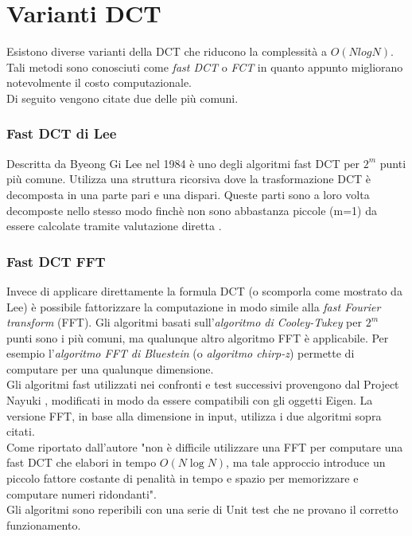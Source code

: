 \documentclass[a4paper,12pt]{report}
\begin{document}
\section{Varianti DCT}
Esistono diverse varianti della DCT che riducono la complessità a \(O(NlogN)\). Tali metodi sono conosciuti come \textit{fast DCT} o \textit{FCT} in quanto appunto migliorano notevolmente il costo computazionale.\\Di seguito vengono citate due delle più comuni.

\subsubsection*{Fast DCT di Lee}
Descritta da Byeong Gi Lee \cite{Lee} nel 1984 è uno degli algoritmi fast DCT per \(2^m\) punti più comune. Utilizza una struttura ricorsiva dove la trasformazione DCT è decomposta in una parte pari e una dispari. Queste parti sono a loro volta decomposte nello stesso modo finchè non sono abbastanza piccole (m=1) da essere calcolate tramite valutazione diretta \cite{LAGERSTRM2001DesignAI}.

\subsubsection*{Fast DCT FFT}
Invece di applicare direttamente la formula DCT (o scomporla come mostrato da Lee) è possibile fattorizzare la computazione in modo simile alla \textit{fast Fourier transform} (FFT). Gli algoritmi basati sull'\textit{algoritmo di Cooley-Tukey} \cite{10.2307/2003354} per \(2^m\) punti sono i più comuni, ma qualunque altro algoritmo FFT è applicabile. Per esempio l'\textit{algoritmo FFT di Bluestein} (o \textit{algoritmo chirp-z}) permette di computare per una qualunque dimensione.\\

\noindent Gli algoritmi fast utilizzati nei confronti e test successivi provengono dal Project Nayuki \cite{nayuki}, modificati in modo da essere compatibili con gli oggetti Eigen. La versione FFT, in base alla dimensione in input, utilizza i due algoritmi sopra citati.\\
Come riportato dall'autore "non è difficile utilizzare una FFT per computare una fast DCT che elabori in tempo \(O(N\log{N})\), ma tale approccio introduce un piccolo fattore costante di penalità in tempo e spazio per memorizzare e computare numeri ridondanti".\\Gli algoritmi sono reperibili con una serie di Unit test che ne provano il corretto funzionamento.
\end{document}
